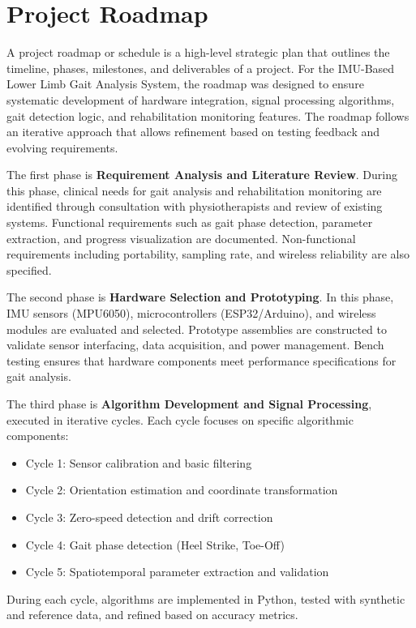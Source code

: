 \documentclass[12pt,a4paper]{report}
\begin{document}
\noindent
{}

\clearpage
{}
\setcounter{section}{0}
\section{Project Roadmap}


A project roadmap or schedule is a high-level strategic plan that outlines the timeline, phases, milestones, and deliverables of a project. For the IMU-Based Lower Limb Gait Analysis System, the roadmap was designed to ensure systematic development of hardware integration, signal processing algorithms, gait detection logic, and rehabilitation monitoring features. The roadmap follows an iterative approach that allows refinement based on testing feedback and evolving requirements.

The first phase is \textbf{Requirement Analysis and Literature Review}. During this phase, clinical needs for gait analysis and rehabilitation monitoring are identified through consultation with physiotherapists and review of existing systems. Functional requirements such as gait phase detection, parameter extraction, and progress visualization are documented. Non-functional requirements including portability, sampling rate, and wireless reliability are also specified.

The second phase is \textbf{Hardware Selection and Prototyping}. In this phase, IMU sensors (MPU6050), microcontrollers (ESP32/Arduino), and wireless modules are evaluated and selected. Prototype assemblies are constructed to validate sensor interfacing, data acquisition, and power management. Bench testing ensures that hardware components meet performance specifications for gait analysis.

The third phase is \textbf{Algorithm Development and Signal Processing}, executed in iterative cycles. Each cycle focuses on specific algorithmic components:
\begin{itemize}
    
\item Cycle 1: Sensor calibration and basic filtering

\item Cycle 2: Orientation estimation and coordinate transformation

\item Cycle 3: Zero-speed detection and drift correction

\item Cycle 4: Gait phase detection (Heel Strike, Toe-Off)

\item Cycle 5: Spatiotemporal parameter extraction and validation
\end{itemize}
During each cycle, algorithms are implemented in Python, tested with synthetic and reference data, and refined based on accuracy metrics.
\end{document}
